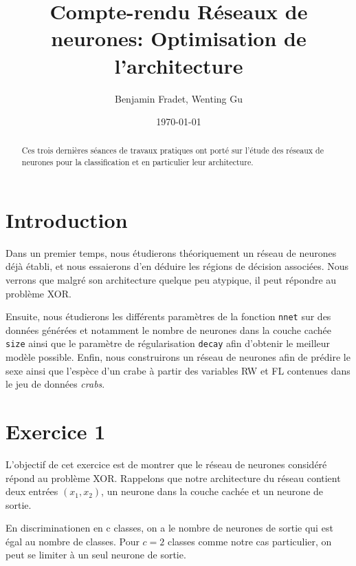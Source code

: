 \documentclass{article}
\title{Compte-rendu Réseaux de neurones: Optimisation de l'architecture}
\author{Benjamin Fradet, Wenting Gu}
\date{\today}
\begin{document}
\maketitle
\thispagestyle{fancy}


\begin{abstract}
    Ces trois dernières séances de travaux pratiques ont porté sur l'étude des
    réseaux de neurones pour la classification et en particulier leur
    architecture.
\end{abstract}


\begin{multicols}{2}

\section{Introduction}\label{sec:intro}

Dans un premier temps, nous étudierons théoriquement un réseau de neurones déjà
établi, et nous essaierons d'en déduire les régions de décision associées. Nous
verrons que malgré son architecture quelque peu atypique, il peut répondre au
problème XOR.

Ensuite, nous étudierons les différents paramètres de la fonction \texttt{nnet}
sur des données générées et notamment le nombre de neurones dans la couche
cachée \texttt{size} ainsi que le paramètre de régularisation \texttt{decay}
afin d'obtenir le meilleur modèle possible. Enfin, nous construirons un réseau
de neurones afin de prédire le sexe ainsi que l'espèce d'un crabe à partir des
variables RW et FL contenues dans le jeu de données \emph{crabs}.


\section{Exercice 1}\label{sec:ex1}

L’objectif de cet exercice est de montrer que le réseau de neurones considéré
répond au problème XOR. Rappelons que notre architecture du réseau contient deux
entrées $(x_1,x_2)$, un neurone dans la couche cachée et un neurone de sortie.

En discriminationen en c classes, on a le nombre de neurones de sortie qui est
égal au nombre de classes. Pour $c = 2$ classes comme notre cas particulier, on
peut se limiter à un seul neurone de sortie.


\end{multicols}
\end{document}
